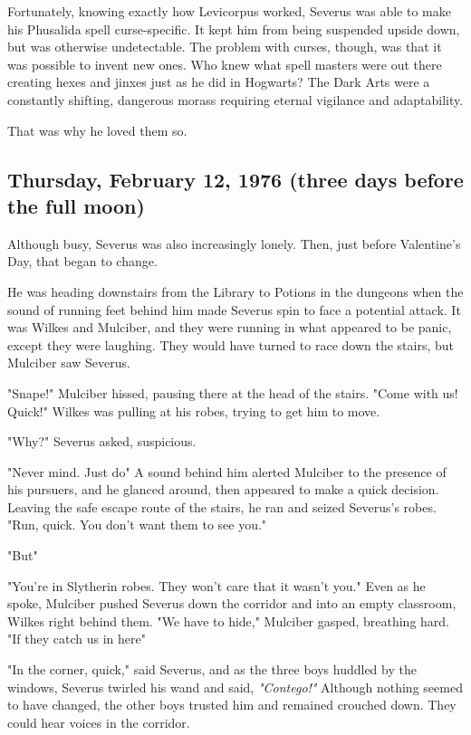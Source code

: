 Fortunately, knowing exactly how Levicorpus worked, Severus was able to make his Phusalida spell curse-specific. It kept him from being suspended upside down, but was otherwise undetectable. The problem with curses, though, was that it was possible to invent new ones. Who knew what spell masters were out there creating hexes and jinxes just as he did in Hogwarts? The Dark Arts were a constantly shifting, dangerous morass requiring eternal vigilance and adaptability.

That was why he loved them so.

\subsection{Thursday, February 12, 1976 (three days before the full moon)}

Although busy, Severus was also increasingly lonely. Then, just before Valentine's Day, that began to change.

He was heading downstairs from the Library to Potions in the dungeons when the sound of running feet behind him made Severus spin to face a potential attack. It was Wilkes and Mulciber, and they were running in what appeared to be panic, except they were laughing. They would have turned to race down the stairs, but Mulciber saw Severus.

"Snape!" Mulciber hissed, pausing there at the head of the stairs. "Come with us! Quick!" Wilkes was pulling at his robes, trying to get him to move.

"Why?" Severus asked, suspicious.

"Never mind. Just do{\el}" A sound behind him alerted Mulciber to the presence of his pursuers, and he glanced around, then appeared to make a quick decision. Leaving the safe escape route of the stairs, he ran and seized Severus's robes. "Run, quick. You don't want them to see you."

"But{\el}"

"You're in Slytherin robes. They won't care that it wasn't you." Even as he spoke, Mulciber pushed Severus down the corridor and into an empty classroom, Wilkes right behind them. "We have to hide," Mulciber gasped, breathing hard. "If they catch us in here{\el}"

"In the corner, quick," said Severus, and as the three boys huddled by the windows, Severus twirled his wand and said, \emph{"Contego!"} Although nothing seemed to have changed, the other boys trusted him and remained crouched down. They could hear voices in the corridor.

